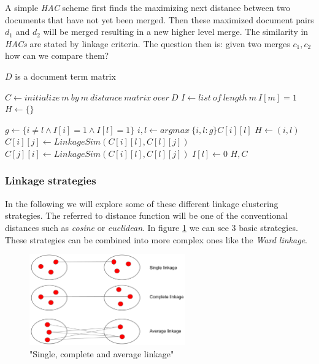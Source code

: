     A simple \emph{HAC} scheme first finds the maximizing next distance between two documents that have not yet been merged. Then these maximized document pairs $d_1$ and $d_2$ will be merged resulting in a new higher level merge. The similarity in \emph{HACs} are stated by linkage criteria. The question then is: given two merges $c_1,c_2$ how can we compare them?

    \begin{algorithm}[H]
    \begin{algorithmic}[1]
      \caption{$D$ is a document term matrix}\label{hac}
        \State $C \gets initialize\:m\:by\:m\:distance\:matrix\:over\:D$
        \State $I \gets list\:of\:length\:m\:I[m]=1$ 
        \State $H \gets \{\}$ 

          \State $g \gets \{i\not=l \wedge I[i]=1 \wedge I[l]=1 \}$
          \State $i,l \gets  argmax\:\{ i,l : g\} C[i][l]$ 
          \State $H \gets (i,l)$ 
           
            \State $C[i][j] \gets LinkageSim(C[i][l], C[l][j])$
            \State $C[j][i] \gets LinkageSim(C[i][l], C[l][j])$
          \EndFor
          \State $I[l] \gets 0$ 
        \EndFor
        \State \Return $H, C$
      \EndFunction
    \end{algorithmic}
    \end{algorithm}

    \subsubsection{Linkage strategies}
    \label{sec:linkages}

    In the following we will explore some of these different linkage clustering strategies.
    The referred to distance function will be one of the conventional distances such as \emph{cosine} or \emph{euclidean}. In figure \ref{linkage_strategy} we can see 3 basic strategies. These strategies can be combined into more complex ones like the \emph{Ward linkage}.

      \begin{figure}[h!]
        \centering
          \includegraphics[width=0.6\textwidth]{linkage_strategy.png}
          \caption{"Single, complete and average linkage"}
          \label{linkage_strategy}
      \end{figure}

